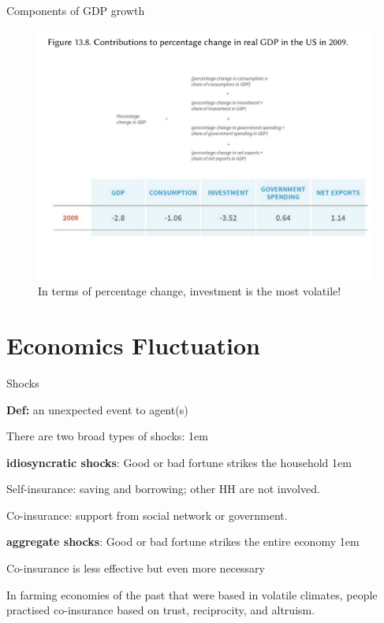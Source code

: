 \documentclass[11pt,aspectratio=43,usenames,dvipsnames]{beamer}
\let\olditemize=\itemize
\let\endolditemize=\enditemize
\renewenvironment{itemize}{\olditemize \itemsep1em}{\endolditemize}
\let\oldenumerate=\enumerate
\let\endoldenumerate=\endenumerate
\renewenvironment{enumerate}{\oldenumerate \itemsep1em}{ \endoldenumerate}
\theoremstyle{definition}
\begin{document}
\begin{frame}{Components of GDP growth}
\label{slide:Components_of_GDP_growth}
    \begin{figure}
        \centering
        \includegraphics[width=.8\textwidth]{./figures/6.pdf}
        \caption{In terms of \alert{percentage change}, investment is the most volatile!}
    \end{figure}
\end{frame}

\section[\faLineChart]{Economics Fluctuation}
\label{sec:Economics_Fluctuation}

\begin{frame}{Shocks}
\label{slide:Shocks}
    \begin{center}
        \textbf{Def:} an \alert{unexpected} event to agent(s)
    \end{center}
    There are two broad types of shocks:
    \begin{enumerate}
        \item \textbf{idiosyncratic shocks}: Good or bad fortune strikes the household
        \begin{itemize}
            \item Self-insurance: saving and borrowing; other HH are not involved.
            \item Co-insurance: support from social network or government.
        \end{itemize}
        \item \textbf{aggregate shocks}: Good or bad fortune strikes the entire economy
        \begin{itemize}
            \item Co-insurance is less effective \alert{but even more necessary}
            \item In farming economies of the past that were based in \alert{volatile climates}, people practised co-insurance based on \alert{trust, reciprocity, and altruism}.
        \end{itemize}

    \end{enumerate}


\end{frame}
\end{document}
